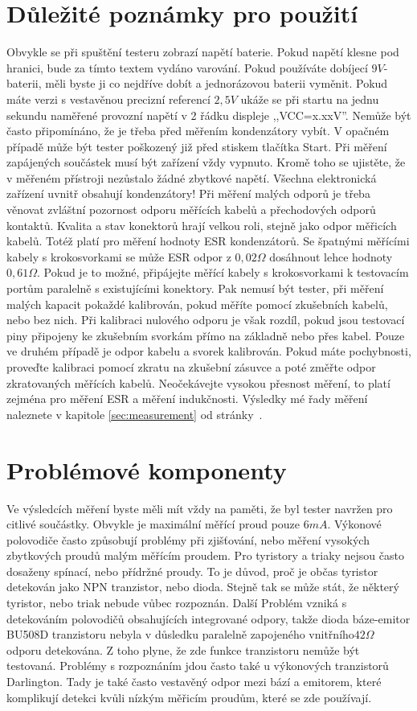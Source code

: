 \section{Důležité poznámky pro použití}
Obvykle se při spuštění testeru zobrazí napětí baterie. Pokud napětí klesne pod hranici,
bude za tímto textem vydáno varování.
Pokud používáte dobíjecí \(9V\)-baterii, měli byste ji co nejdříve dobít a jednorázovou baterii vyměnit.
Pokud máte verzi s vestavěnou precizní referencí \(2,5V\) ukáže se při startu na jednu sekundu
naměřené provozní napětí v 2 řádku displeje ,,VCC=x.xxV''.
Nemůže být často připomínáno, že je třeba před měřením kondenzátory vybít.
V opačném případě může být tester poškozený již před stiskem tlačítka Start.
Při měření zapájených součástek musí být zařízení vždy vypnuto.
Kromě toho se ujistěte, že v měřeném přístroji nezůstalo žádné zbytkové napětí.
Všechna elektronická zařízení uvnitř obsahují kondenzátory!
Při měření malých odporů je třeba věnovat zvláštní pozornost odporu měřících kabelů a přechodových
odporů kontaktů.
Kvalita a stav konektorů hrají velkou roli, stejně jako odpor měřicích kabelů.
Totéž platí pro měření hodnoty ESR kondenzátorů.
Se špatnými měřícími kabely s krokosvorkami se může ESR odpor z \(0,02\Omega\) dosáhnout
lehce hodnoty \(0,61\Omega\).
Pokud je to možné, připájejte měřící kabely s krokosvorkami k testovacím portům
paralelně s existujícími konektory.
Pak nemusí být tester, při měření malých kapacit pokaždé kalibrován,
pokud měříte pomocí zkušebních kabelů, nebo bez nich.
Při kalibraci nulového odporu je však rozdíl, pokud jsou testovací piny připojeny ke zkušebním
svorkám přímo na základně nebo přes kabel.
Pouze ve druhém případě je odpor kabelu a svorek kalibrován.
Pokud máte pochybnosti, proveďte kalibraci pomocí zkratu na zkušební zásuvce a poté
změřte odpor zkratovaných měřících kabelů.
Neočekávejte vysokou přesnost měření, to platí zejména pro měření ESR a měření indukčnosti.
Výsledky mé řady měření naleznete v kapitole \ref{sec:measurement} od stránky~\pageref{sec:measurement}.



\section{Problémové komponenty}
Ve výsledcích měření byste měli mít vždy na paměti, že byl tester navržen pro citlivé součástky.
Obvykle je maximální měřící proud pouze \(6mA\).
Výkonové polovodiče často způsobují problémy při zjišťování,
nebo měření vysokých zbytkových proudů malým měřícím proudem.
Pro tyristory a triaky nejsou často dosaženy spínací, nebo přídržné proudy.
To je důvod, proč je občas tyristor detekován jako NPN tranzistor, nebo dioda.
Stejně tak se může stát, že některý tyristor, nebo triak nebude vůbec rozpoznán.
Další Problém vzniká s detekováním polovodičů obsahujících integrované odpory,
takže dioda báze-emitor BU508D tranzistoru nebyla v důsledku paralelně zapojeného
vnitřního\(42 \Omega\) odporu detekována.
Z toho plyne, že zde funkce tranzistoru nemůže být testovaná.
Problémy s rozpoznáním jdou často také u výkonových tranzistorů Darlington.
Tady je také často vestavěný odpor mezi bází a emitorem,
které komplikují detekci kvůli nízkým měřicím proudům, které se zde používají.

